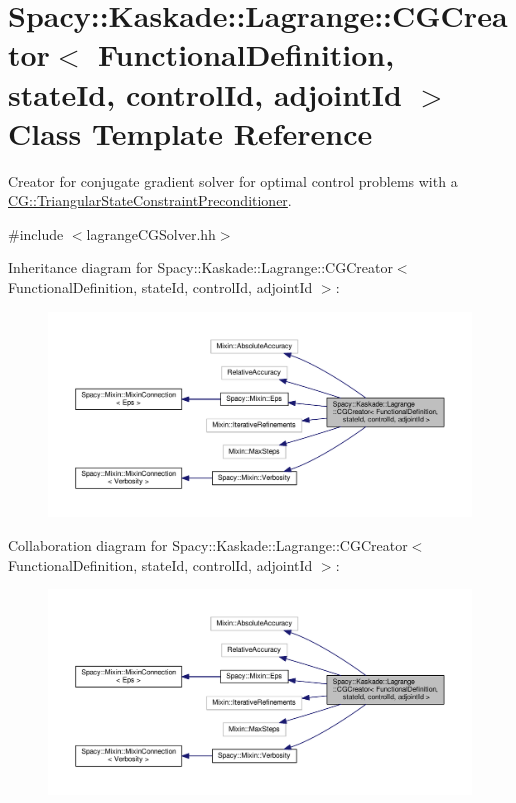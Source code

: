 \hypertarget{classSpacy_1_1Kaskade_1_1Lagrange_1_1CGCreator}{}\section{Spacy\+:\+:Kaskade\+:\+:Lagrange\+:\+:C\+G\+Creator$<$ Functional\+Definition, state\+Id, control\+Id, adjoint\+Id $>$ Class Template Reference}
\label{classSpacy_1_1Kaskade_1_1Lagrange_1_1CGCreator}


Creator for conjugate gradient solver for optimal control problems with a \hyperlink{classSpacy_1_1CG_1_1TriangularStateConstraintPreconditioner}{C\+G\+::\+Triangular\+State\+Constraint\+Preconditioner}.  




{\ttfamily \#include $<$lagrange\+C\+G\+Solver.\+hh$>$}



Inheritance diagram for Spacy\+:\+:Kaskade\+:\+:Lagrange\+:\+:C\+G\+Creator$<$ Functional\+Definition, state\+Id, control\+Id, adjoint\+Id $>$\+:
\nopagebreak
\begin{figure}[H]
\begin{center}
\leavevmode
\includegraphics[width=350pt]{classSpacy_1_1Kaskade_1_1Lagrange_1_1CGCreator__inherit__graph}
\end{center}
\end{figure}


Collaboration diagram for Spacy\+:\+:Kaskade\+:\+:Lagrange\+:\+:C\+G\+Creator$<$ Functional\+Definition, state\+Id, control\+Id, adjoint\+Id $>$\+:
\nopagebreak
\begin{figure}[H]
\begin{center}
\leavevmode
\includegraphics[width=350pt]{classSpacy_1_1Kaskade_1_1Lagrange_1_1CGCreator__coll__graph}
\end{center}
\end{figure}
